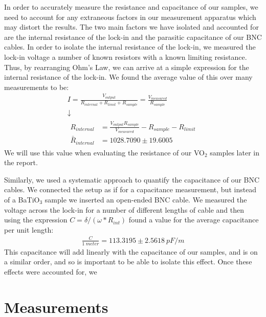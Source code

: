\documentclass[%
 reprint,
 amsmath,amssymb,
 aps,
 pra,
]{revtex4-1}
\begin{document}
In order to accurately measure the resistance and capacitance of our samples, we need to account for any extraneous factors in our measurement apparatus which may distort the results. The two main factors we have isolated and accounted for are the internal resistance of the lock-in and the parasitic capacitance of our BNC cables. In order to isolate the internal resistance of the lock-in, we measured the lock-in voltage a number of known resistors with a known limiting resistance. Thus, by rearranging Ohm's Law, we can arrive at a simple expression for the internal resistance of the lock-in. We found the average value of this over many measurements to be:
\begin{gather}
	I = \frac{V_{output}}{R_{internal} + R_{limit} + R_{sample}} = \frac{V_{measured}}{R_{sample}} \nonumber \\
	\downarrow \nonumber \\
	\begin{align}
		R_{internal} 		& = \frac{V_{output}R_{sample}}{V_{measured}} - R_{sample} - R_{limit} \nonumber \\
		\bar{R}_{internal} 	& = 1028.7090 \pm 19.6005 \nonumber
	\end{align}
\end{gather}
We will use this value when evaluating the resistance of our VO$_2$ samples later in the report.

Similarly, we used a systematic approach to quantify the capacitance of our BNC cables. We connected the setup as if for a capacitance measurement, but instead of a BaTiO$_3$ sample we inserted an open-ended BNC cable. We measured the voltage across the lock-in for a number of different lengths of cable and then using the expression $C = \delta/(\omega*R_{int})$ found a value for the average capacitance per unit length:
\begin{gather}
	\frac{C}{1~meter} = 113.3195 \pm 2.5618~pF/m \nonumber
\end{gather}
This capacitance will add linearly with the capacitance of our samples, and is on a similar order, and so is important to be able to isolate this effect. Once these effects were accounted for, we 

\section{Measurements}
\end{document}
